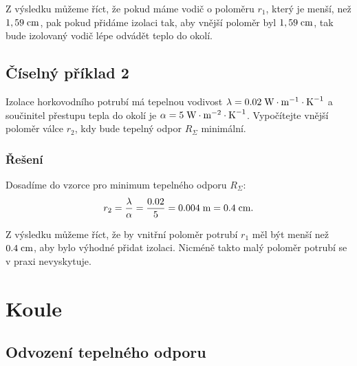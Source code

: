 \documentclass{article}
\begin{document}
Z výsledku můžeme říct, že pokud máme vodič o poloměru $r_1$, který je menší, než $1,59 \; \textrm{cm}$, pak pokud přidáme izolaci tak, aby vnější poloměr byl $1,59 \; \textrm{cm}$, tak bude izolovaný vodič lépe odvádět teplo do okolí.


\subsection{Číselný příklad 2 \spicy \spicy}
Izolace horkovodního potrubí má tepelnou vodivost $\lambda = 0.02 \; \textrm{W} \cdot \textrm{m}^{-1} \cdot \textrm{K}^{-1}$ a součinitel přestupu tepla do okolí je $\alpha = 5 \; \textrm{W} \cdot \textrm{m}^{-2} \cdot \textrm{K}^{-1}$. Vypočítejte vnější poloměr válce $r_2$, kdy bude tepelný odpor $R_\Sigma$ minimální.

\subsubsection{Řešení}
Dosadíme do vzorce pro minimum tepelného odporu $R_\Sigma$:
$$
    r_2 = \frac{\lambda}{\alpha} = \frac{0.02}{5} = 0.004 \; \textrm{m} = 0.4 \; \textrm{cm}.
$$

Z výsledku můžeme říct, že by vnitřní poloměr potrubí $r_1$ měl být menší než $0.4 \; \textrm{cm}$, aby bylo výhodné přidat izolaci. Nicméně takto malý poloměr potrubí se v praxi nevyskytuje.

\newpage



\section{ Koule \spicy \spicy \spicy}


\subsection{Odvození tepelného odporu}

\begin{center}
\end{center}
\end{document}
